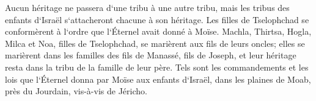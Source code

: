 \verse Aucun héritage ne passera d`une tribu à une autre tribu, mais les tribus des enfants d`Israël s`attacheront chacune à son héritage. 
\verse Les filles de Tselophchad se conformèrent à l`ordre que l`Éternel avait donné à Moïse. 
\verse Machla, Thirtsa, Hogla, Milca et Noa, filles de Tselophchad, se marièrent aux fils de leurs oncles; 
\verse elles se marièrent dans les familles des fils de Manassé, fils de Joseph, et leur héritage resta dans la tribu de la famille de leur père. 
\verse Tels sont les commandements et les lois que l`Éternel donna par Moïse aux enfants d`Israël, dans les plaines de Moab, près du Jourdain, vis-à-vis de Jéricho. 
